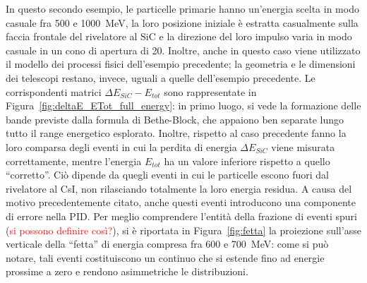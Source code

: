 In questo secondo esempio, le particelle primarie hanno un'energia scelta in modo casuale fra 500 e 1000~MeV, la loro posizione iniziale è estratta casualmente sulla faccia frontale del rivelatore al SiC e la direzione del loro impulso varia in modo casuale in un cono di apertura di 20\textdegree{}.
Inoltre, anche in questo caso viene utilizzato il modello dei processi fisici dell'esempio precedente; la geometria e le dimensioni dei telescopi restano, invece, uguali a quelle dell'esempio precedente.
Le corrispondenti matrici $\Delta E_{SiC} - E_{tot}$ sono rappresentate in Figura~\ref{fig:deltaE_ETot_full_energy}: in primo luogo, si vede la formazione delle bande previste dalla formula di Bethe-Block, che appaiono ben separate lungo tutto il range energetico esplorato.
Inoltre, rispetto al caso precedente fanno la loro comparsa degli eventi in cui la perdita di energia $\Delta E_{SiC}$ viene misurata correttamente, mentre l'energia $E_{tot}$ ha un valore inferiore rispetto a quello ``corretto''. 
Ciò dipende da quegli eventi in cui le particelle escono fuori dal rivelatore al CsI, non rilasciando totalmente la loro energia residua.
A causa del motivo precedentemente citato, anche questi eventi introducono una componente di errore nella PID.
Per meglio comprendere l'entità della frazione di eventi spuri (\textcolor{red}{si possono definire così?}), si è riportata in Figura~\ref{fig:fetta} la proiezione sull'asse verticale della ``fetta'' di energia compresa fra 600 e 700~MeV: come si può notare, tali eventi costituiscono un continuo che si estende fino ad energie prossime a zero e rendono asimmetriche le distribuzioni. 


